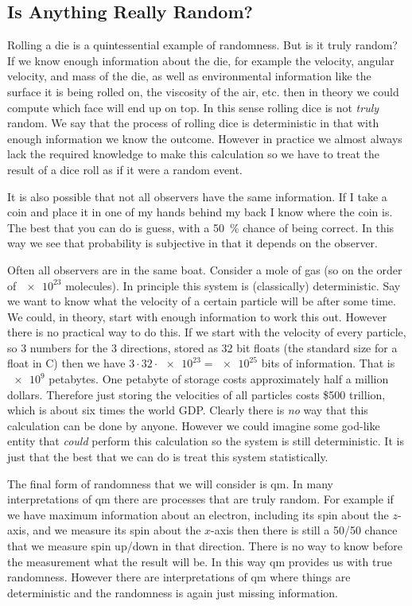     \subsection{Is Anything Really Random?}
    Rolling a die is a quintessential example of randomness.
    But is it truly random?
    If we know enough information about the die, for example the velocity, angular velocity, and mass of the die, as well as environmental information like the surface it is being rolled on, the viscosity of the air, etc. then in theory we could compute which face will end up on top.
    In this sense rolling dice is not \emph{truly} random.
    We say that the process of rolling dice is deterministic in that with enough information we know the outcome.
    However in practice we almost always lack the required knowledge to make this calculation so we have to treat the result of a dice roll as if it were a random event.
    
    It is also possible that not all observers have the same information.
    If I take a coin and place it in one of my hands behind my back I know where the coin is.
    The best that you can do is guess, with a \SI{50}{\percent} chance of being correct.
    In this way we see that probability is subjective in that it depends on the observer.
    
    Often all observers are in the same boat.
    Consider a mole of gas (so on the order of \(\num{e23}\) molecules).
    In principle this system is (classically) deterministic.
    Say we want to know what the velocity of a certain particle will be after some time.
    We could, in theory, start with enough information to work this out.
    However there is no practical way to do this.
    If we start with the velocity of every particle, so 3 numbers for the 3 directions, stored as 32 bit floats (the standard size for a float in C) then we have \(3\cdot 32\cdot\num{e23} = \num{e25}\) bits of information.
    That is \(\num{e9}\) petabytes.
    One petabyte of storage costs approximately half a million dollars.
    Therefore just storing the velocities of all particles costs \$500 trillion, which is about six times the world GDP.
    Clearly there is \emph{no} way that this calculation can be done by anyone.
    However we could imagine some god-like entity that \emph{could} perform this calculation so the system is still deterministic.
    It is just that the best that we can do is treat this system statistically.
    
    The final form of randomness that we will consider is \acrfull{qm}.
    In many interpretations of \acrshort{qm} there are processes that are truly random.
    For example if we have maximum information about an electron, including its spin about the \(z\)-axis, and we measure its spin about the \(x\)-axis then there is still a 50/50 chance that we measure spin up/down in that direction.
    There is no way to know before the measurement what the result will be.
    In this way \acrshort{qm} provides us with true randomness.
    However there are interpretations of \acrshort{qm} where things are deterministic and the randomness is again just missing information.
    
